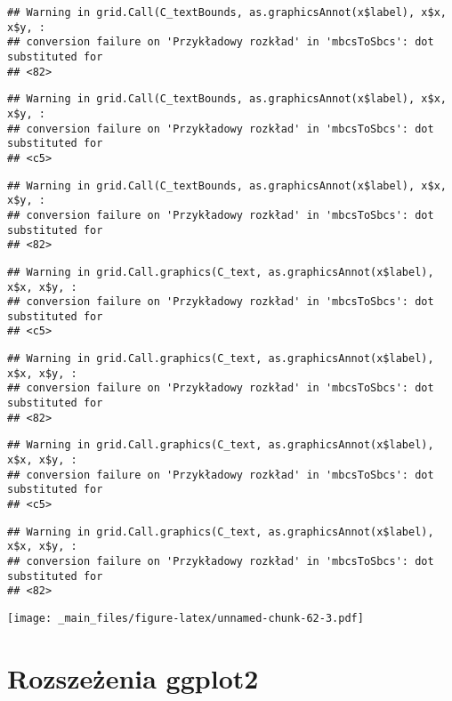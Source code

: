 \documentclass[
]{book}
\begin{document}
\begin{verbatim}
## Warning in grid.Call(C_textBounds, as.graphicsAnnot(x$label), x$x, x$y, :
## conversion failure on 'Przykładowy rozkład' in 'mbcsToSbcs': dot substituted for
## <82>
\end{verbatim}

\begin{verbatim}
## Warning in grid.Call(C_textBounds, as.graphicsAnnot(x$label), x$x, x$y, :
## conversion failure on 'Przykładowy rozkład' in 'mbcsToSbcs': dot substituted for
## <c5>
\end{verbatim}

\begin{verbatim}
## Warning in grid.Call(C_textBounds, as.graphicsAnnot(x$label), x$x, x$y, :
## conversion failure on 'Przykładowy rozkład' in 'mbcsToSbcs': dot substituted for
## <82>
\end{verbatim}

\begin{verbatim}
## Warning in grid.Call.graphics(C_text, as.graphicsAnnot(x$label), x$x, x$y, :
## conversion failure on 'Przykładowy rozkład' in 'mbcsToSbcs': dot substituted for
## <c5>
\end{verbatim}

\begin{verbatim}
## Warning in grid.Call.graphics(C_text, as.graphicsAnnot(x$label), x$x, x$y, :
## conversion failure on 'Przykładowy rozkład' in 'mbcsToSbcs': dot substituted for
## <82>
\end{verbatim}

\begin{verbatim}
## Warning in grid.Call.graphics(C_text, as.graphicsAnnot(x$label), x$x, x$y, :
## conversion failure on 'Przykładowy rozkład' in 'mbcsToSbcs': dot substituted for
## <c5>
\end{verbatim}

\begin{verbatim}
## Warning in grid.Call.graphics(C_text, as.graphicsAnnot(x$label), x$x, x$y, :
## conversion failure on 'Przykładowy rozkład' in 'mbcsToSbcs': dot substituted for
## <82>
\end{verbatim}

\texttt{[image: \_main\_files/figure-latex/unnamed-chunk-62-3.pdf]}

\hypertarget{rozszeux17cenia-ggplot2}{%
\section{Rozszeżenia ggplot2}\label{rozszeux17cenia-ggplot2}}
\end{document}
